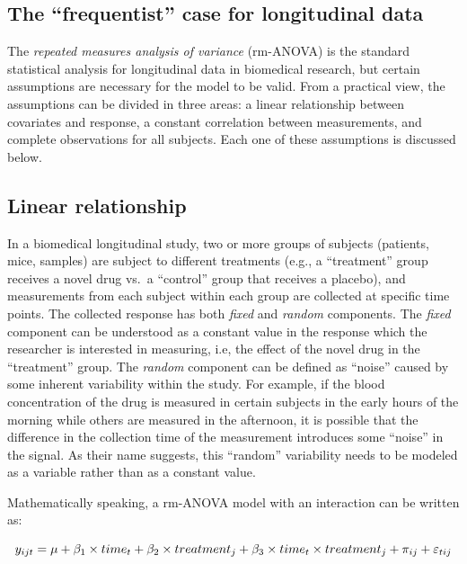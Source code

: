 \documentclass[
]{article}
\begin{document}
\hypertarget{the-frequentist-case-for-longitudinal-data}{%
\subsection{The ``frequentist'' case for longitudinal data}\label{the-frequentist-case-for-longitudinal-data}}

The \emph{repeated measures analysis of variance} (rm-ANOVA) is the standard statistical analysis for longitudinal data in biomedical research, but certain assumptions are necessary for the model to be valid. From a practical view, the assumptions can be divided in three areas: a linear relationship between covariates and response, a constant correlation between measurements, and complete observations for all subjects. Each one of these assumptions is discussed below.

\hypertarget{linear-relationship}{%
\subsection{Linear relationship}\label{linear-relationship}}

In a biomedical longitudinal study, two or more groups of subjects (patients, mice, samples) are subject to different treatments (e.g., a ``treatment'' group receives a novel drug vs.~a ``control'' group that receives a placebo), and measurements from each subject within each group are collected at specific time points. The collected response has both \emph{fixed} and \emph{random} components. The \emph{fixed} component can be understood as a constant value in the response which the researcher is interested in measuring, i.e, the effect of the novel drug in the ``treatment'' group. The \emph{random} component can be defined as ``noise'' caused by some inherent variability within the study. For example, if the blood concentration of the drug is measured in certain subjects in the early hours of the morning while others are measured in the afternoon, it is possible that the difference in the collection time of the measurement introduces some ``noise'' in the signal. As their name suggests, this ``random'' variability needs to be modeled as a variable rather than as a constant value.

Mathematically speaking, a rm-ANOVA model with an interaction can be written as:

\begin{equation}
y_{ijt} = \mu+ \beta_1 \times time_{t} + \beta_2 \times treatment_{j} + \beta_3 \times time_{t}\times treatment_{j}+\pi_{ij} +\varepsilon_{tij}\\ 
\label{eq:linear-model}
\end{equation}
\end{document}
